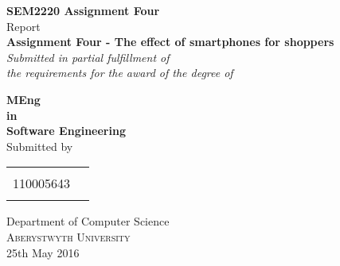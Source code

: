 \begin{titlepage}

\begin{center}

\textup{\small {\bf SEM2220 Assignment Four} \\ Report}\\[0.2in]

\Large \textbf {Assignment Four - The effect of smartphones for shoppers }\\[0.5in]

       \small \emph{Submitted in partial fulfillment of\\
        the requirements for the award of the degree of}
        \vspace{.2in}

       {\bf MEng  \\in\\ Software Engineering}\\[0.5in]

\normalsize Submitted by \\
\begin{table}[h]
\centering
\begin{tabular}{lr}\hline \\
110005643  \\ \\ \hline 
\end{tabular}
\end{table}

\vspace{.1in}

\Large{Department of Computer Science}\\
\normalsize
\textsc{Aberystwyth University}\\
\vspace{4.2cm}
25th May 2016

\end{center}

\end{titlepage}
